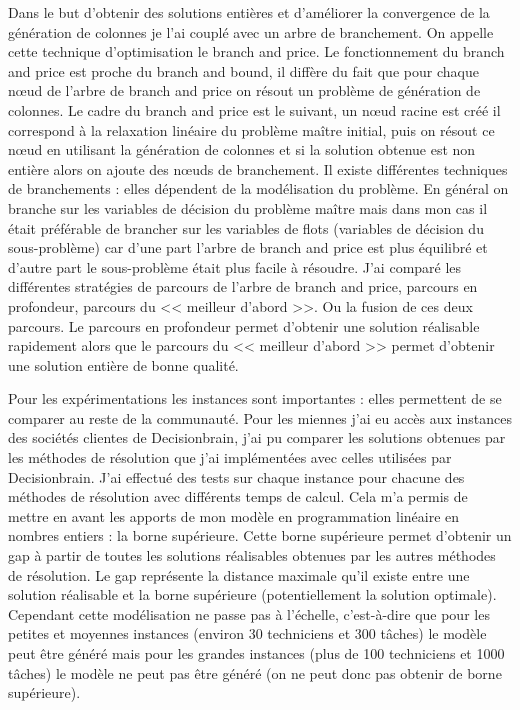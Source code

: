 \documentclass[]{report}
\begin{document}
Dans le but d'obtenir des solutions entières et d'améliorer la convergence de la génération de colonnes je l'ai couplé avec un arbre de branchement. On appelle cette technique d'optimisation le branch and price.
Le fonctionnement du branch and price est proche du branch and bound, il diffère du fait que pour chaque n\oe ud de l'arbre de branch and price on résout un problème de génération de colonnes.
Le cadre du branch and price est le suivant, un n\oe ud racine est créé il correspond à la relaxation linéaire du problème maître initial, puis on résout ce n\oe ud en utilisant la génération de colonnes et si la solution obtenue est non entière alors on ajoute des n\oe uds de branchement.
Il existe différentes techniques de branchements : elles dépendent de la modélisation du problème.
En général on branche sur les variables de décision du problème maître mais dans mon cas il était préférable de brancher sur les variables de flots (variables de décision du sous-problème) car d'une part l'arbre de branch and price est plus équilibré et d'autre part le sous-problème était plus facile à résoudre.
J'ai comparé les différentes stratégies de parcours de l'arbre de branch and price, parcours en profondeur, parcours du << meilleur d'abord >>. Ou la fusion de ces deux parcours.
Le parcours en profondeur permet d'obtenir une solution réalisable rapidement alors que le parcours du << meilleur d'abord >> permet d'obtenir une solution entière de bonne qualité.

Pour les expérimentations les instances sont importantes : elles permettent de se comparer au reste de la communauté.
Pour les miennes j'ai eu accès aux instances des sociétés clientes de Decisionbrain, j'ai pu comparer les solutions obtenues par les méthodes de résolution que j'ai implémentées avec celles utilisées par Decisionbrain.
J'ai effectué des tests sur chaque instance pour chacune des méthodes de résolution avec différents temps de calcul.
Cela m'a permis de mettre en avant les apports de mon modèle en programmation linéaire en nombres entiers : la borne supérieure.
Cette borne supérieure permet d'obtenir un gap à partir de toutes les solutions réalisables obtenues par les autres méthodes de résolution.
Le gap représente la distance maximale qu'il existe entre une solution réalisable et la borne supérieure (potentiellement la solution optimale).
Cependant cette modélisation ne passe pas à l'échelle, c'est-à-dire que pour les petites et moyennes instances (environ 30 techniciens et 300 tâches) le modèle peut être généré mais pour les grandes instances (plus de 100 techniciens et 1000 tâches) le modèle ne peut pas être généré (on ne peut donc pas obtenir de borne supérieure).
\end{document}

